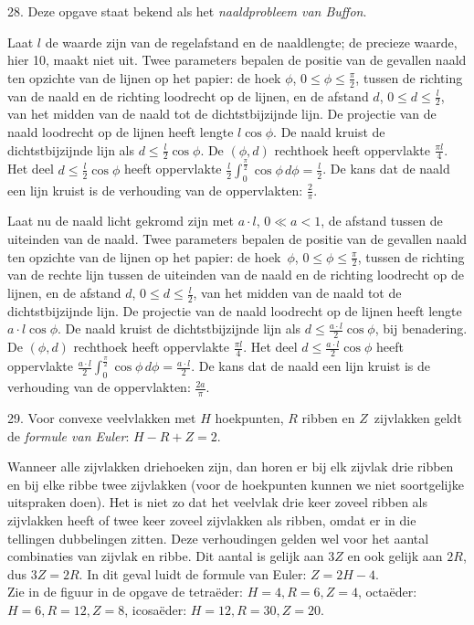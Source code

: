 \begin{problem}{28.}
    Deze opgave staat bekend als het \textit{naaldprobleem van Buffon}.

    Laat $l$ de waarde zijn van de regelafstand en de naaldlengte; de precieze waarde, hier 10, maakt niet uit. Twee parameters bepalen de positie van de gevallen naald ten opzichte van de lijnen op het papier: de hoek $\phi$, $0 \leq \phi \leq \frac{\pi}{2}$, tussen de richting van de naald en de richting loodrecht op de lijnen, en de afstand $d$, $0 \leq d \leq \frac{l}{2}$, van het midden van de naald tot de dichtstbijzijnde lijn. De projectie van de naald loodrecht op de lijnen heeft lengte $l \cos \phi$. De naald kruist de dichtstbijzijnde lijn als $d \leq \frac{l}{2} \cos \phi$. De $(\phi,d)$ rechthoek heeft oppervlakte $\frac{\pi l}{4}$. Het deel $d \leq \frac{l}{2} \cos \phi$ heeft oppervlakte $\frac{l}{2} \int_{0}^{\frac{\pi}{2}} \cos \phi \,d \phi = \frac{l}{2}$. De kans dat de naald een lijn kruist is de verhouding van de oppervlakten: $\frac{2}{\pi}$.

    Laat nu de naald licht gekromd zijn met $a \cdot l$, $0 \ll a < 1$, de afstand tussen de uiteinden van de naald. Twee parameters bepalen de positie van de gevallen naald ten opzichte van de lijnen op het papier: de hoek~$\phi$, $0 \leq \phi \leq \frac{\pi}{2}$, tussen de richting van de rechte lijn tussen de uiteinden van de naald en de richting loodrecht op de lijnen, en de afstand $d$, $0 \leq d \leq \frac{l}{2}$, van het midden van de naald tot de dichtstbijzijnde lijn. De projectie van de naald loodrecht op de lijnen heeft lengte $a \cdot l \cos \phi$. De naald kruist de dichtstbijzijnde lijn als \mbox{$d \leq \frac{a \cdot l}{2} \cos \phi$}, bij benadering. De $(\phi,d)$ rechthoek heeft oppervlakte $\frac{\pi l}{4}$. Het deel $d \leq \frac{a \cdot l}{2} \cos \phi$ heeft oppervlakte $\frac{a \cdot l}{2} \int_{0}^{\frac{\pi}{2}} \cos \phi \,d \phi = \frac{a \cdot l}{2}$. De kans dat de naald een lijn kruist is de verhouding van de oppervlakten: $\frac{2 a}{\pi}$.
\end{problem}

\begin{problem}{29.}
    Voor convexe veelvlakken met $H$ hoekpunten, $R$ ribben en $Z$~zij\-vlakken geldt de \textit{formule van Euler}: $H - R + Z = 2$.

    Wanneer alle zijvlakken driehoeken zijn, dan horen er bij elk zijvlak drie ribben en bij elke ribbe twee zijvlakken (voor de hoekpunten kunnen we niet soortgelijke uitspraken doen). Het is niet zo dat het veelvlak drie keer zoveel ribben als zijvlakken heeft of twee keer zoveel zijvlakken als ribben, omdat er in die tellingen dubbelingen zitten. Deze verhoudingen gelden wel voor het aantal combinaties van zijvlak en ribbe. Dit aantal is gelijk aan $3 Z$ en ook gelijk aan $2 R$, dus $3 Z = 2 R$. In dit geval luidt de formule van Euler: $Z = 2 H - 4$.\\Zie in de figuur in de opgave de tetraëder: $H = 4,R = 6,Z = 4$, octaëder: $H = 6,R = 12,Z = 8$, icosaëder: $H = 12,R = 30,Z = 20$.
\end{problem}

